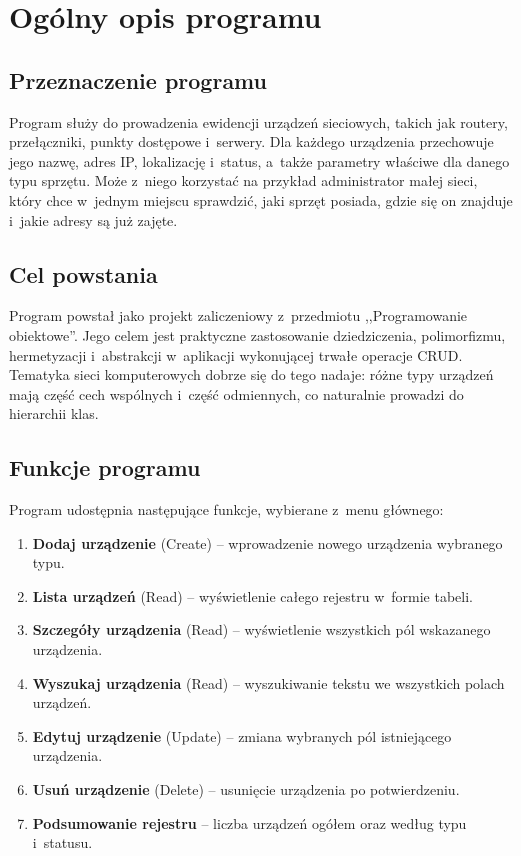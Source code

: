 \chapter{Ogólny opis programu}\label{ch:opis}

\section{Przeznaczenie programu}

Program służy do prowadzenia ewidencji urządzeń sieciowych, takich jak routery, przełączniki, punkty dostępowe i~serwery. Dla każdego urządzenia przechowuje jego nazwę, adres IP, lokalizację i~status, a~także parametry właściwe dla danego typu sprzętu. Może z~niego korzystać na przykład administrator małej sieci, który chce w~jednym miejscu sprawdzić, jaki sprzęt posiada, gdzie się on znajduje i~jakie adresy są już zajęte.

\section{Cel powstania}

Program powstał jako projekt zaliczeniowy z~przedmiotu ,,Programowanie obiektowe''. Jego celem jest praktyczne zastosowanie dziedziczenia, polimorfizmu, hermetyzacji i~abstrakcji w~aplikacji wykonującej trwałe operacje CRUD. Tematyka sieci komputerowych dobrze się do tego nadaje: różne typy urządzeń mają część cech wspólnych i~część odmiennych, co naturalnie prowadzi do hierarchii klas.

\section{Funkcje programu}

Program udostępnia następujące funkcje, wybierane z~menu głównego:

\begin{enumerate}
	\item \textbf{Dodaj urządzenie} (Create) -- wprowadzenie nowego urządzenia wybranego typu.
	\item \textbf{Lista urządzeń} (Read) -- wyświetlenie całego rejestru w~formie tabeli.
	\item \textbf{Szczegóły urządzenia} (Read) -- wyświetlenie wszystkich pól wskazanego urządzenia.
	\item \textbf{Wyszukaj urządzenia} (Read) -- wyszukiwanie tekstu we wszystkich polach urządzeń.
	\item \textbf{Edytuj urządzenie} (Update) -- zmiana wybranych pól istniejącego urządzenia.
	\item \textbf{Usuń urządzenie} (Delete) -- usunięcie urządzenia po potwierdzeniu.
	\item \textbf{Podsumowanie rejestru} -- liczba urządzeń ogółem oraz według typu i~statusu.
\end{enumerate}

